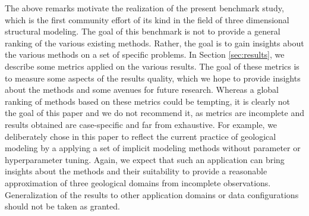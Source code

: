 \documentclass[final]{ring20}
\begin{document}
The above remarks motivate the realization of the present benchmark study, which is the first community effort of its kind in the field of three dimensional structural modeling. The goal of this benchmark is not to provide a general ranking of the various existing methods. Rather, the goal is to gain insights about the various methods on a set of specific problems. In Section \ref{sec:results}, we describe some metrics applied on the various results. The goal of these metrics is to measure some aspects of the results quality, which we hope to provide insights about the methods and some avenues for future research. Whereas a global ranking of methods based on these metrics could be tempting, it is clearly not the goal of this paper and we do not recommend it, as metrics are incomplete and results obtained are case-specific and far from exhaustive. For example, we deliberately chose in this paper to reflect the current practice of geological modeling by a applying a set of implicit modeling methods without parameter or hyperparameter tuning. Again, we expect that such an application can bring insights about the methods and their suitability to provide a reasonable approximation of three geological domains from incomplete observations. Generalization of the results to other application domains or data configurations should not be taken as granted.  

\end{document}
